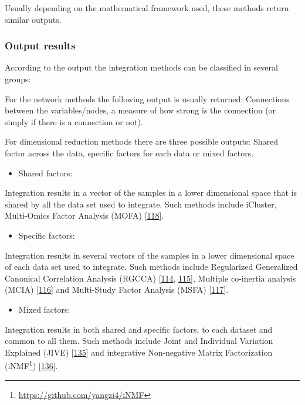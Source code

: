 \documentclass[
  12pt,
  a4paper,
  twoside,
  openright]{book}
\DeclareRobustCommand{\href}[2]{#2\footnote{\url{#1}}}
\providecommand{\tightlist}{%
  \setlength{\itemsep}{0pt}\setlength{\parskip}{0pt}}
\begin{document}
Usually depending on the mathematical framework used, these methods return similar outputs.

\hypertarget{output-results}{%
\subsubsection{Output results}\label{output-results}}

According to the output the integration methods can be classified in several groups:

For the network methods the following output is usually returned: Connections between the variables/nodes, a measure of how strong is the connection (or simply if there is a connection or not).

For dimensional reduction methods there are three possible outputs: Shared factor across the data, specific factors for each data or mixed factors.

\begin{itemize}
\tightlist
\item
  Shared factors:
\end{itemize}

Integration results in a vector of the samples in a lower dimensional space that is shared by all the data set used to integrate.
Such methods include iCluster, Multi-Omics Factor Analysis (MOFA) {[}\protect\hyperlink{ref-argelaguet_multi-omics_2018}{118}{]}.

\begin{itemize}
\tightlist
\item
  Specific factors:
\end{itemize}

Integration results in several vectors of the samples in a lower dimensional space of each data set used to integrate.
Such methods include Regularized Generalized Canonical Correlation Analysis (RGCCA) {[}\protect\hyperlink{ref-tenenhaus_regularized_2011}{114}, \protect\hyperlink{ref-tenenhaus_variable_2014}{115}{]}, Multiple co-inertia analysis (MCIA) {[}\protect\hyperlink{ref-culhane_cross-platform_2003}{116}{]} and Multi-Study Factor Analysis (MSFA) {[}\protect\hyperlink{ref-vito_multi-study_2019}{117}{]}.

\begin{itemize}
\tightlist
\item
  Mixed factors:
\end{itemize}

Integration results in both shared and specific factors, to each dataset and common to all them.
Such methods include Joint and Individual Variation Explained (JIVE) {[}\protect\hyperlink{ref-lock2013a}{135}{]} and integrative Non-negative Matrix Factorization (\href{https://github.com/yangzi4/iNMF}{iNMF}) {[}\protect\hyperlink{ref-yang2016}{136}{]}.
\end{document}
